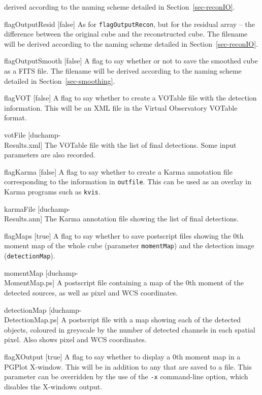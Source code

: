 \begin{Lentry}
  derived according to the naming scheme detailed in
  Section~\ref{sec-reconIO}.
\item[{flagOutputResid [false]}] As for
  \texttt{flagOutputRecon}, but for the residual array -- the
  difference between the original cube and the reconstructed cube. The
  filename will be derived according to the naming scheme detailed in
  Section~\ref{sec-reconIO}.
\item[{flagOutputSmooth [false]}] A flag to say whether or not
  to save the smoothed cube as a FITS file. The filename will be
  derived according to the naming scheme detailed in
  Section~\ref{sec-smoothing}.
\item[{flagVOT [false]}] A flag to say whether to create a
  VOTable file with the detection information. This will be an XML
  file in the Virtual Observatory VOTable format.
\item[{votFile [duchamp-\\Results.xml]}] The VOTable file with
  the list of final detections. Some input parameters are also
  recorded. 
\item[{flagKarma [false]}] A flag to say whether to create a
  Karma annotation file corresponding to the information in
  \texttt{outfile}. This can be used as an overlay in Karma
  programs such as \texttt{kvis}.
\item[{karmaFile [duchamp-\\Results.ann]}] The Karma annotation
  file showing the list of final detections.  
\item[{flagMaps [true]}] A flag to say whether to save
  postscript files showing the 0th moment map of the whole cube
  (parameter \texttt{momentMap}) and the detection image
  (\texttt{detectionMap}).
\item[{momentMap [duchamp-\\MomentMap.ps]}] A postscript file
  containing a map of the 0th moment of the detected sources, as well
  as pixel and WCS coordinates.
\item[{detectionMap [duchamp-\\DetectionMap.ps]}] A postscript
  file with a map showing each of the detected objects, coloured in
  greyscale by the number of detected channels in each spatial
  pixel. Also shows pixel and WCS coordinates.
\item[{flagXOutput [true]}] A flag to say whether to display a
  0th moment map in a PGPlot X-window. This will be in addition to any
  that are saved to a file. This parameter can be overridden by the
  use of the \texttt{-x} command-line option, which disables the
  X-windows output.
\end{Lentry}

